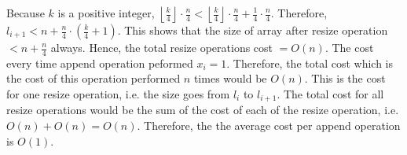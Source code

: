 \documentclass[addpoints]{exam}
\begin{document}
\begin{questions}
\begin{solution}
    \newline
    \newline
    Because $k$ is a positive integer, $\left\lfloor \frac{k}{4} \right\rfloor \cdot \frac{n}{4} < \left\lfloor \frac{k}{4} \right\rfloor \cdot \frac{n}{4} + \frac{1}{4} \cdot \frac{n}{4}$.
    \newline
    \newline
    Therefore, $l_{i+1} < n + \frac{n}{4} \cdot \left(\frac{k}{4} + 1\right)$.
    \newline
    \newline
    This shows that the size of array after resize operation $ < n + \frac{n}{4}$ always. Hence, the total resize operations cost $ = O(n)$.
    \newline
    \newline
    The cost every time append operation peformed $x_i =  1$. Therefore, the total cost which is the cost of this operation performed $n$ times would be $O(n)$. This is the cost for one resize operation, i.e. the size goes from $l_i$ to $l_{i+1}$.
    \newline
    \newline
    The total cost for all resize operations would be the sum of the cost of each of the resize operation, i.e. $O(n) + O(n) = O(n)$. Therefore, the the average cost per append operation is $O(1)$.
    


  \end{solution}

\end{questions}


% 

% 

% 
\end{document}

